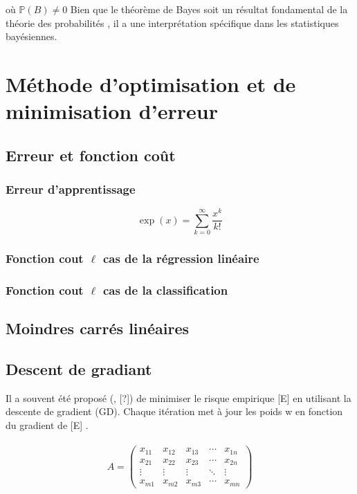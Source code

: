		où $\mathbb{P}(B) \ne 0$ Bien que le théorème de Bayes soit un résultat fondamental de la théorie des probabilités , il a une interprétation spécifique dans les statistiques bayésiennes.
		
		
		
	\section{Méthode d'optimisation et de minimisation d'erreur}
	\subsection{Erreur et fonction coût}
		\lipsum[1]
	\subsubsection{Erreur d'apprentissage}
		\lipsum[1]
	
		\[\exp(x)=\sum_{k=0}^{\infty}\frac{x^k}{k!}\]
		\lipsum[4]
	\subsubsection{Fonction cout $\ell$ cas de la régression linéaire}
		\lipsum[1]
	\subsubsection{Fonction cout $\ell$ cas  de la classification}
		\lipsum[1]
	
	\subsection{Moindres carrés linéaires}
		\lipsum[1] %
	
	
	
	\subsection{Descent de gradiant}
	
		Il a souvent été proposé (\eg, [?]) de minimiser le risque empirique [E] en utilisant la descente de gradient (GD). Chaque itération met à jour les poids w en fonction du gradient de [E] \cite{bottou2012stochastic}.\\
		\lipsum[1] \\ 
		
		$$A = \begin{pmatrix}
		x_{11} & x_{12} & x_{13} & \cdots & x_{1n} \\
		x_{21} & x_{22} & x_{23} & \cdots & x_{2n} \\
		\vdots & \vdots & \vdots & \ddots & \vdots \\
		x_{m1} & x_{m2} & x_{m3} & \cdots & x_{mn} 
		\end{pmatrix}$$
	
